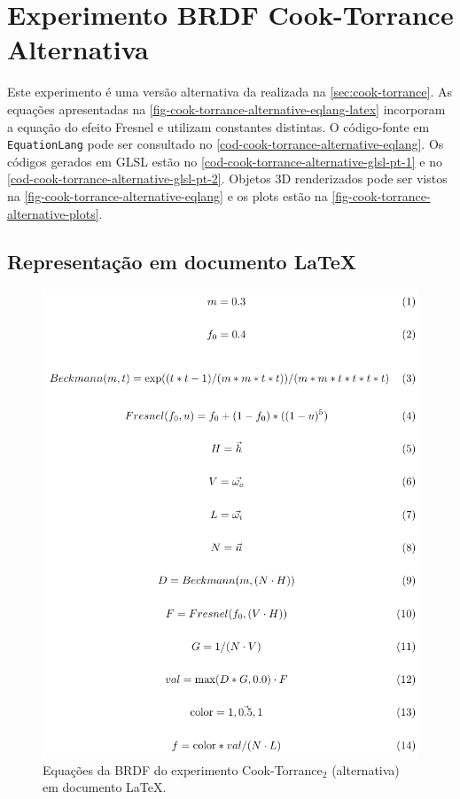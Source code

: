 \section{Experimento BRDF Cook-Torrance Alternativa}

Este experimento é uma versão alternativa da realizada na \autoref{sec:cook-torrance}. As equações apresentadas na \autoref{fig-cook-torrance-alternative-eqlang-latex} incorporam a equação do efeito Fresnel e utilizam constantes distintas. O código-fonte em \texttt{EquationLang} pode ser consultado no \autoref{cod-cook-torrance-alternative-eqlang}. Os códigos gerados em GLSL estão no \autoref{cod-cook-torrance-alternative-glsl-pt-1} e no \autoref{cod-cook-torrance-alternative-glsl-pt-2}. Objetos 3D renderizados pode ser vistos na \autoref{fig-cook-torrance-alternative-eqlang} e os plots estão na \autoref{fig-cook-torrance-alternative-plots}.


\subsection{Representação em documento \LaTeX{}}
\begin{figure}[H]
    \caption{\label{fig-cook-torrance-alternative-eqlang-latex}
    \small Equações da BRDF do experimento Cook-Torrance$_2$ (alternativa) em documento \LaTeX{}.}
    \begin{center}
        \includegraphics[scale=0.92]{./Imagens/brdfs/cook-torrance-alternative.pdf}
    \end{center}
\end{figure}

